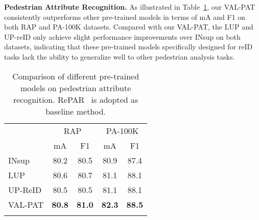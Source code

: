 \documentclass[final]{cvpr}
\begin{document}
\noindent
\textbf{Pedestrian Attribute Recognition.}
As illustrated in Table~\ref{tab:par}, our VAL-PAT consistently outperforms other pre-trained models in terms of mA and F1 on both RAP and PA-100K datasets.
Compared with our VAL-PAT, the LUP and UP-reID only achieve slight performance improvements over INsup on both datasets, indicating that these pre-trained models specifically designed for reID tasks lack the ability to generalize well to other pedestrian analysis tasks.
\begin{table}[h!]
\vspace{-1mm}
\small
    \centering
    \setlength{\tabcolsep}{3.5mm}
    \begin{tabular}{l|cc|cc}
    \shline
    \centering
    \multirow{2}{*}{pre-train} & \multicolumn{2}{c|}{RAP} & \multicolumn{2}{c}{PA-100K} \\
    \cline{2-5} & mA & F1 & mA & F1 \\
    \hline
    \centering
    INsup    & 80.2 & 80.5 & 80.9 & 87.4 \\
    \centering
\centering
    LUP  & 80.6 & 80.7 & 81.1 & 88.1 \\
    \centering
    UP-ReID  & 80.5 & 80.5 & 81.1 & 88.1 \\
    \centering
    VAL-PAT & \textbf{80.8} & \textbf{81.0} & \textbf{82.3} & \textbf{88.5} \\
    \shline
    \end{tabular}
    \vspace{-1mm}
    \caption{Comparison of different pre-trained models on pedestrian attribute recognition.
    RePAR~\cite{jia2021rethinking} is adopted as baseline method.}
    \vspace{-2mm}
    \label{tab:par}
\end{table}
\end{document}
